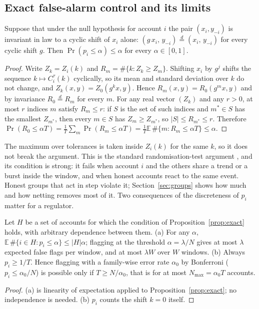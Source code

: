 \subsection{Exact false-alarm control and its limits}\label{sec:valid}

\begin{proposition}[validity]\label{prop:exact}
Suppose that under the null hypothesis for account $i$ the pair $(x_i,y_{-i})$ is invariant in law to a cyclic shift of $x_i$ alone: $(g\,x_i,\,y_{-i})\overset{d}{=}(x_i,\,y_{-i})$ for every cyclic shift $g$. Then $\Pr(p_i\le\alpha)\le\alpha$ for every $\alpha\in[0,1]$.
\end{proposition}
\begin{proof}
Write $Z_k=Z_i(k)$ and $R_m=\#\{k:Z_k\ge Z_m\}$. Shifting $x_i$ by $g^j$ shifts the sequence $k\mapsto C^\tau_i(k)$ cyclically, so its mean and standard deviation over $k$ do not change, and $Z_k(x,y)=Z_0(g^kx,y)$. Hence $R_m(x,y)=R_0(g^mx,y)$ and by invariance $R_0\overset{d}{=}R_m$ for every $m$. For any real vector $(Z_k)$ and any $r>0$, at most $r$ indices $m$ satisfy $R_m\le r$: if $S$ is the set of such indices and $m^\ast\in S$ has the smallest $Z_{m^\ast}$, then every $m\in S$ has $Z_m\ge Z_{m^\ast}$, so $|S|\le R_{m^\ast}\le r$. Therefore $\Pr(R_0\le\alpha T)=\frac1T\sum_m\Pr(R_m\le\alpha T)=\frac1T\mathbb E\,\#\{m:R_m\le\alpha T\}\le\alpha$. \qedhere
\end{proof}

The maximum over tolerances is taken inside $Z_i(k)$ for the same $k$, so it does not break the argument. This is the standard randomisation-test argument \citep[see][for time-shift tests on dependent series]{liang2025}, and its condition is strong: it fails when account $i$ and the others share a trend or a burst inside the window, and when honest accounts react to the same event. Honest groups that act in step violate it; Section~\ref{sec:groups} shows how much and how netting removes most of it. Two consequences of the discreteness of $p_i$ matter for a regulator.

\begin{proposition}\label{prop:budget}
Let $H$ be a set of accounts for which the condition of Proposition~\ref{prop:exact} holds, with arbitrary dependence between them. (a) For any $\alpha$, $\mathbb E\,\#\{i\in H:p_i\le\alpha\}\le |H|\alpha$; flagging at the threshold $\alpha=\lambda/N$ gives at most $\lambda$ expected false flags per window, and at most $\lambda W$ over $W$ windows. (b) Always $p_i\ge1/T$. Hence flagging with a family-wise error rate $\alpha_0$ by Bonferroni ($p_i\le\alpha_0/N$) is possible only if $T\ge N/\alpha_0$, that is for at most $N_{\max}=\alpha_0T$ accounts.
\end{proposition}
\begin{proof}
(a) is linearity of expectation applied to Proposition~\ref{prop:exact}; no independence is needed. (b) $p_i$ counts the shift $k=0$ itself. \qedhere
\end{proof}

